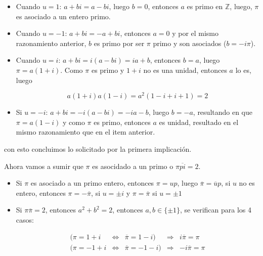 \documentclass{article}
\begin{document}
      \begin{itemize}

        \item Cuando $u = 1$: $a + bi = a - bi$, luego $b = 0$, entonces $a$ es primo en $\mathbb{Z}$,
          luego, $\pi$ es asociado a un entero primo.

        \item Cuando $u = -1$: $a + bi = -a + bi$, entonces $a = 0$ y por el mismo razonamiento anterior, 
              $b$ es primo por ser $\pi$ primo y son asociados ($b = -i \pi$).

        \item Cuando $u = i$: $a + bi = i(a - bi) = ia + b$, entonces $b = a$, luego $\pi = a(1 + i)$. 
              Como $\pi$ es primo y $1 + i$ no es una unidad, entonces $a$ lo es, luego 

              \[
                a(1 + i) a (1 - i) = a^2 (1 - i + i + 1) = 2
              \]

        \item Si $u = -i$: $a + bi = -i(a - bi) = -ia - b$, luego $b = -a$, resultando en que 
              $\pi = a(1 - i)$ y como $\pi$ es primo, entonces $a$ es unidad, resultado en el mismo 
              razonamiento que en el item anterior.
      \end{itemize}

      con esto concluimos lo solicitado por la primera implicación.

      Ahora vamos a sumir que $\pi$ es asocidado a un primo o $\pi \overline{pi} = 2$.

      \begin{itemize}
        \item Si $\pi$ es asociado a un primo entero, entonces $\pi = u p$, luego $\overline{\pi} = \overline{u} p$, 
              si $u$ no es entero, entonces $\pi = -\overline{\pi}$, si $u = \pm i$ y $\pi = \overline{\pi}$ 
              si $u = \pm 1$

            \item  Si $\pi \overline{\pi} = 2$, entonces $a^2 + b^2 = 2$, entonces $a, b \in \{\pm 1\}$, se verifican
                   para los 4 casos:

                   \begin{equation*}
                     \begin{aligned}
                       (\pi = 1 + i & \iff & \overline{\pi} = 1 - i) & \Rightarrow &  i\overline{\pi} = \pi \\
                       (\pi = -1 + i & \iff & \overline{\pi} = -1 - i) & \Rightarrow &  -i\overline{\pi} = \pi \\
                     \end{aligned}
                   \end{equation*}
      \end{itemize}
\end{document}
